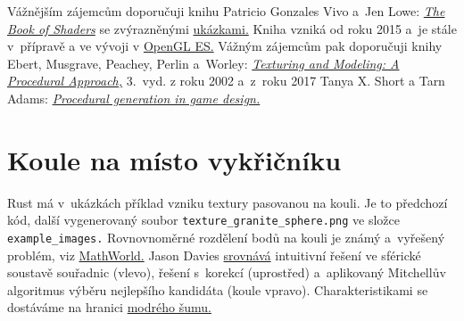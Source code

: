 \noindent
{}


Vážnějším zájemcům doporučuji knihu Patricio Gonzales Vivo a~Jen Lowe: 
\href{https://thebookofshaders.com/}{\emph{The Book of Shaders}} se zvýrazněnými 
\href{https://thebookofshaders.com/examples/?chapter=proceduralTexture}{ukázkami.} Kniha vzniká od roku 2015 a~je stále v~přípravě a ve vývoji v 
\href{https://www.khronos.org/opengles/}{OpenGL ES.}
%
Vážným zájemcům pak doporučuji knihy Ebert, Musgrave, Peachey, Perlin a~Worley: 
\href{https://www.amazon.com/Texturing-Modeling-Third-Procedural-Approach/dp/1558608486}{\textit{Texturing and Modeling: A Procedural Approach,}} 3.~vyd. z roku 2002 a~z~roku 2017 Tanya X. Short a Tarn Adams: 
\href{https://www.amazon.com/Procedural-Generation-Design-Tanya-Short/dp/1498799191}{\textit{Procedural generation in game design.}}





\section{Koule na místo vykřičníku}

Rust má v~ukázkách příklad vzniku textury pasovanou na kouli. Je to předchozí kód, další vygenerovaný soubor \texttt{texture\_granite\_sphere.png} ve složce \texttt{example\_images.}
Rovnovnoměrné rozdělení bodů na kouli je známý a~vyřešený problém, viz 
\href{https://mathworld.wolfram.com/SpherePointPicking.html}{MathWorld.}
Jason Davies 
\href{https://www.jasondavies.com/maps/random-points/}{srovnává} intuitivní řešení ve sférické soustavě souřadnic (vlevo), řešení s~korekcí (uprostřed) a~aplikovaný Mitchellův algoritmus výběru nejlepšího kandidáta (koule vpravo). Charakteristikami se dostáváme na hranici 
\href{https://en.wikipedia.org/wiki/Colors_of_noise#Blue_noise}{modrého šumu.} 
\smallskip

\noindent
\vyska=35mm
\hfill
{}\hfill
{}\hfill




